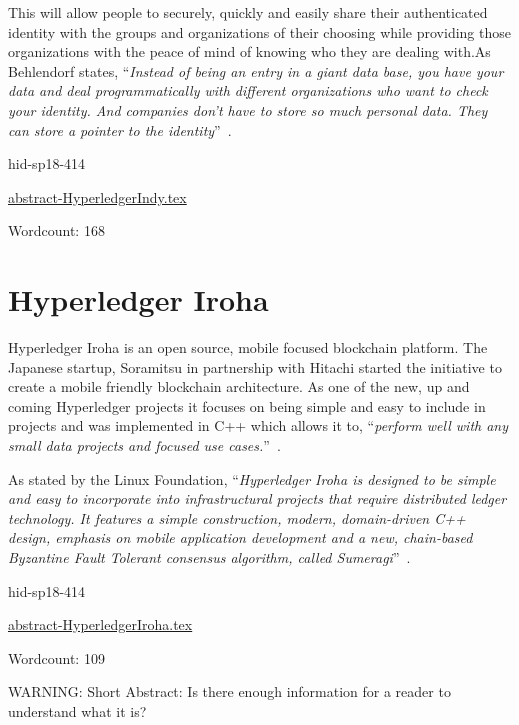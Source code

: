 This will allow people to securely, quickly and easily share their authenticated 
identity with the groups and organizations of their choosing while providing those 
organizations with the peace of mind of knowing who they are dealing with.As Behlendorf 
states, \color{blue}``\emph{Instead of being an entry in a giant data base, you have your data and deal 
programmatically with different organizations who want to check your identity. And 
companies don’t have to store so much personal data. They can store a pointer to the 
identity}''\color{black}~\cite{hid-sp18-414-Behlendor}.


\begin{IU}

hid-sp18-414

\href{https://github.com/cloudmesh-community/hid-sp18-414/blob/master//technology/abstract-HyperledgerIndy.tex}{abstract-HyperledgerIndy.tex}

 

Wordcount: 168

\end{IU}

\section{Hyperledger Iroha}


Hyperledger Iroha is an open source, mobile focused blockchain
platform.  The Japanese startup, Soramitsu in partnership with Hitachi
started the initiative to create a mobile friendly blockchain
architecture. As one of the new, up and coming Hyperledger projects it
focuses on being simple and easy to include in projects and was
implemented in C++ which allows it to, \color{blue}``\emph{perform well with any small
data projects and focused use cases.}''\color{black}~\cite{hid-sp18-414-Behlendorf}.

As stated by the Linux Foundation, \color{blue}``\emph{Hyperledger Iroha is designed to
be simple and easy to incorporate into infrastructural projects that
require distributed ledger technology. It features a simple
construction, modern, domain-driven C++ design, emphasis on mobile
application development and a new, chain-based Byzantine Fault
Tolerant consensus algorithm, called 
Sumeragi}''\color{black}~\cite{hid-sp18-414-Active_Status_Iroha}.



\begin{IU}

hid-sp18-414

\href{https://github.com/cloudmesh-community/hid-sp18-414/blob/master//technology/abstract-HyperledgerIroha.tex}{abstract-HyperledgerIroha.tex}

 

Wordcount: 109

WARNING: Short Abstract: Is there enough information for a reader to understand what it is?

\end{IU}

